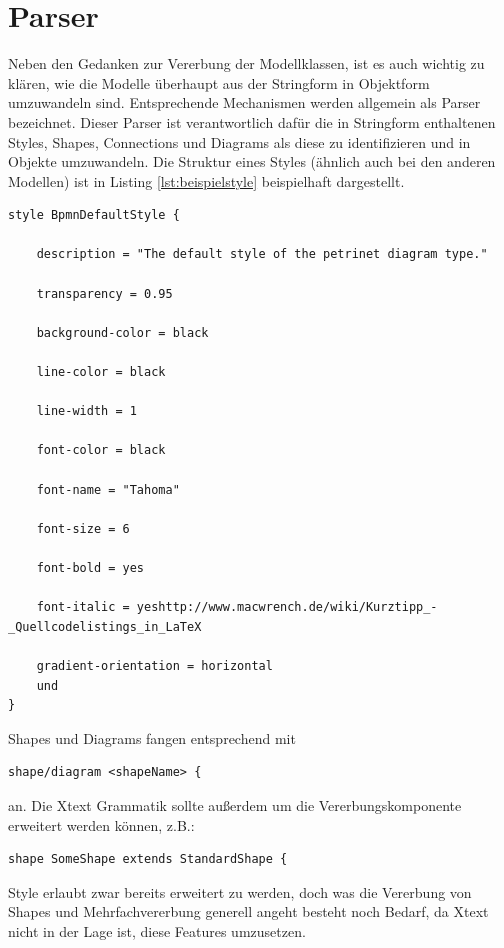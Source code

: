 \section{Parser}Neben den Gedanken zur Vererbung der Modellklassen, ist es auch wichtig zu klären, wie die Modelle überhaupt aus der Stringform in Objektform umzuwandeln sind. Entsprechende Mechanismen werden allgemein als Parser bezeichnet. Dieser Parser ist verantwortlich dafür die in Stringform enthaltenen Styles, Shapes, Connections und Diagrams als diese zu identifizieren und in Objekte umzuwandeln. 
Die Struktur eines Styles (ähnlich auch bei den anderen Modellen) ist in Listing \ref{lst:beispielstyle} beispielhaft dargestellt.
\begin{center}
\label{lst:beispielstyle}
\begin{lstlisting}[style=spray, caption={Beispielhafte Style Definition über die entsprechende Style DSL},label={lst:beispielstyle}]
style BpmnDefaultStyle {

	description = "The default style of the petrinet diagram type."
	
	transparency = 0.95

	background-color = black
	
	line-color = black

	line-width = 1

	font-color = black

	font-name = "Tahoma"
	
	font-size = 6

	font-bold = yes

	font-italic = yeshttp://www.macwrench.de/wiki/Kurztipp_-_Quellcodelistings_in_LaTeX

	gradient-orientation = horizontal
	und
}
\end{lstlisting}
\end{center}
Shapes und Diagrams fangen entsprechend mit
\begin{lstlisting}[style=spray, aboveskip=0pt]
shape/diagram <shapeName> {
\end{lstlisting} an.
Die Xtext Grammatik sollte außerdem um die Vererbungskomponente erweitert werden können, z.B.:
\begin{lstlisting}[style=spray, aboveskip=0pt]
shape SomeShape extends StandardShape {
\end{lstlisting}Style erlaubt zwar bereits erweitert zu werden, doch was die Vererbung von Shapes und Mehrfachvererbung generell angeht besteht noch Bedarf, da Xtext nicht in der Lage ist, diese Features umzusetzen.
